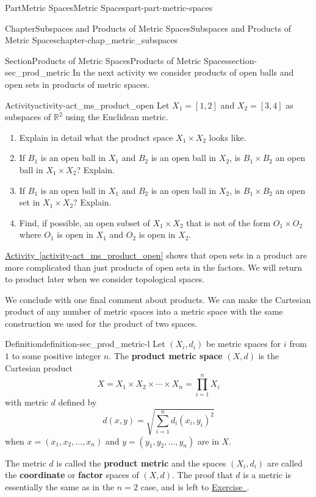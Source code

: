 \documentclass[oneside,10pt,]{book}
\newcommand{\xreffont}{\relax}
\newcommand{\terminology}[1]{\textbf{#1}}
\numberwithin{equation}{chapter}
\newcommand{\R}{\mathbb{R}}
\begin{document}
\begin{partptx}{Part}{Metric Spaces}{}{Metric Spaces}{}{}{part-part-metric-spaces}
\begin{chapterptx}{Chapter}{Subspaces and Products of Metric Spaces}{}{Subspaces and Products of Metric Spaces}{}{}{chapter-chap_metric_subspaces}
\begin{sectionptx}{Section}{Products of Metric Spaces}{}{Products of Metric Spaces}{}{}{section-sec_prod_metric}
In the next activity we consider products of open balls and open sets in products of metric spaces.%
\begin{activity}{Activity}{}{activity-act_ms_product_open}%
Let \(X_1 = [1,2]\) and \(X_2 = [3,4]\) as subspaces of \(\R^2\) using the Euclidean metric.%
\begin{enumerate}[font=\bfseries,label=(\alph*),ref=\alph*]%
\item{}Explain in detail what the product space \(X_1 \times X_2\) looks like.%
\item{}If \(B_1\) is an open ball in \(X_1\) and \(B_2\) is an open ball in \(X_2\), is \(B_1 \times B_2\) an open ball in \(X_1 \times X_2\)? Explain.%
\item{}If \(B_1\) is an open ball in \(X_1\) and \(B_2\) is an open ball in \(X_2\), is \(B_1 \times B_2\) an open set in \(X_1 \times X_2\)? Explain.%
\item{}Find, if possible, an open subset of \(X_1 \times X_2\) that is not of the form \(O_1 \times O_2\) where \(O_1\) is open in \(X_1\) and \(O_2\) is open in \(X_2\).%
\end{enumerate}%
\end{activity}%
\hyperref[activity-act_ms_product_open]{Activity~{\xreffont\ref{activity-act_ms_product_open}}} shows that open sets in a product are more complicated than just products of open sets in the factors. We will return to product later when we consider topological spaces.%
\par
We conclude with one final comment about products. We can make the Cartesian product of any number of metric spaces into a metric space with the same construction we used for the product of two spaces.%
\begin{definition}{Definition}{}{definition-sec_prod_metric-l}%
%
Let \((X_i, d_i)\) be metric spaces for \(i\) from \(1\) to some positive integer \(n\). The \terminology{product metric space} \((X,d)\) is the Cartesian product%
\begin{equation*}
X = X_1 \times X_2 \times \cdots \times X_n = \prod_{i=1}^n X_i
\end{equation*}
with metric \(d\) defined by%
\begin{equation*}
d(x,y) = \sqrt{\sum_{i=1}^n d_i(x_i,y_i)^2}
\end{equation*}
when \(x = (x_1, x_2, \ldots,
x_n)\) and \(y = (y_1, y_2, \ldots, y_n)\) are in \(X\).%
\end{definition}
 The metric \(d\) is called the \terminology{product metric} and the spaces \((X_i,d_i)\) are called the \terminology{coordinate} or \terminology{factor} spaces of \((X,d)\). The proof that \(d\) is a metric is essentially the same as in the \(n=2\) case, and is left to \hyperlink{exercise-ex_prod_metric}{Exercise~{\xreffont 6}}.%

\end{sectionptx}
\end{chapterptx}
\end{partptx}
\end{document}
